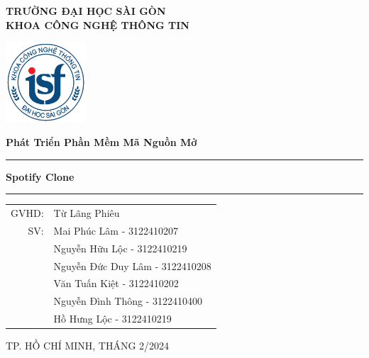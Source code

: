 \begin{titlepage}
    \begin{center}
    \textbf{TRƯỜNG ĐẠI HỌC SÀI GÒN} \\
    \textbf{KHOA CÔNG NGHỆ THÔNG TIN}
    
    \vspace{1cm}
    
    \includegraphics[width=3cm]{logoITSGU.png}
    
    \vspace{1cm}
    \end{center}
    
    \noindent\textbf{{\Large Phát Triển Phần Mềm Mã Nguồn Mở}}  
    \vspace{0.5cm}
    
    \noindent\rule{\textwidth}{0.5pt}
    
    \vspace{0.5cm}
    
    \noindent\textbf{{\Huge Spotify Clone}}
    
    \vspace{0.5cm}
    
    \noindent\rule{\textwidth}{0.5pt}
    
    \vspace{2.5cm}
    
    \begin{center}
        \begin{tabular}{rl}
        GVHD: & Từ Lãng Phiêu \\
        SV: & Mai Phúc Lâm - 3122410207 \\
        & Nguyễn Hữu Lộc - 3122410219 \\
        & Nguyễn Đức Duy Lâm - 3122410208 \\
        & Văn Tuấn Kiệt - 3122410202 \\
        & Nguyễn Đình Thông - 3122410400 \\
        & Hồ Hưng Lộc - 3122410219 \\
        \end{tabular}
        \end{center}
    \vfill
    
    \begin{center}
    {\footnotesize TP. HỒ CHÍ MINH, THÁNG 2/2024}
    \end{center}
    
    \end{titlepage}
    